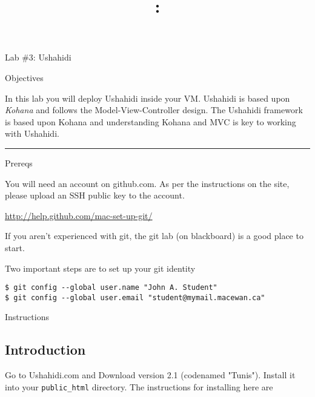 \documentclass[letterpaper]{article}
\title{\course{}: \activity{}}
\date{}
\newcommand{\activity}{Lab \#3}
\newcommand{\horizrule}{\noindent\rule{\linewidth}{0.15mm}}
\begin{document}
\reversemarginpar

\vspace{0.5cm}

\begin{center}
  \Large{\activity{}: Ushahidi}
\end{center}

\vspace{0.5cm}

\begin{center}
  \large{Objectives}
\end{center}

In this lab you will deploy Ushahidi inside your VM.  Ushahidi is based upon
{\it Kohana} and follows the Model-View-Controller design.  The Ushahidi
framework is based upon Kohana and
understanding Kohana and MVC is key to working with Ushahidi.
\vspace{3mm}\\
\horizrule

\begin{center}
  \large{Prereqs}
\end{center}

You will need an account on github.com.  As per the instructions on the site,
please upload an SSH public key to the account.

\url{http://help.github.com/mac-set-up-git/}

If you aren't experienced with git, the git lab (on blackboard) is a good place
to start.

Two important steps are to set up your git identity

\begin{verbatim}
$ git config --global user.name "John A. Student"
$ git config --global user.email "student@mymail.macewan.ca"
\end{verbatim}

\begin{center}
  \large{Instructions}
\end{center}

%

\subsection*{Introduction}

Go to Ushahidi.com and Download version 2.1 (codenamed "Tunis").  Install it
into your {\tt public\_html} directory.  The instructions for installing here
are
\end{document}
